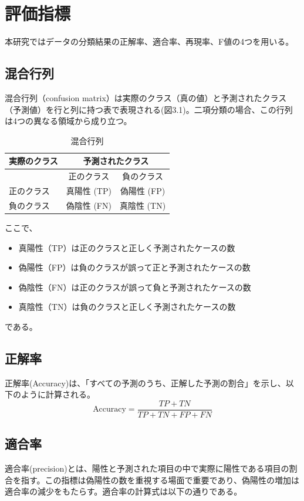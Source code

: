 \documentclass[platex]{suribt}
\begin{document}
\section{評価指標}
本研究ではデータの分類結果の正解率、適合率、再現率、F値の4つを用いる。
\subsection{混合行列}
混合行列（confusion matrix）は実際のクラス（真の値）と予測されたクラス（予測値）を行と列に持つ表で表現される(図3.1)。二項分類の場合、この行列は4つの異なる領域から成り立つ。
\begin{table}[h]
  \centering
  \begin{tabular}{|l|c|c|}
  \hline
  \multicolumn{1}{|c|}{\textbf{実際のクラス}} & \multicolumn{2}{c|}{\textbf{予測されたクラス}} \\ \hline
   & 正のクラス & 負のクラス \\ \hline
  正のクラス & 真陽性 (TP) & 偽陽性 (FP) \\ \hline
  負のクラス & 偽陰性 (FN) & 真陰性 (TN) \\ \hline
  \end{tabular}
  \caption{混合行列}
\end{table}

ここで、
\begin{itemize}
  \item  真陽性（TP）は正のクラスと正しく予測されたケースの数
  \item  偽陽性（FP）は負のクラスが誤って正と予測されたケースの数
  \item  偽陰性（FN）は正のクラスが誤って負と予測されたケースの数
  \item  真陰性（TN）は負のクラスと正しく予測されたケースの数
\end{itemize}
である。


\subsection{正解率}
正解率(Accuracy)は、「すべての予測のうち、正解した予測の割合」を示し、以下のように計算される。
\begin{equation}
  \text{Accuracy} = \frac{TP + TN}{TP + TN + FP + FN}
\end{equation}

\subsection{適合率}
適合率(precision)とは、陽性と予測された項目の中で実際に陽性である項目の割合を指す。この指標は偽陽性の数を重視する場面で重要であり、偽陽性の増加は適合率の減少をもたらす。適合率の計算式は以下の通りである。
\end{document}
